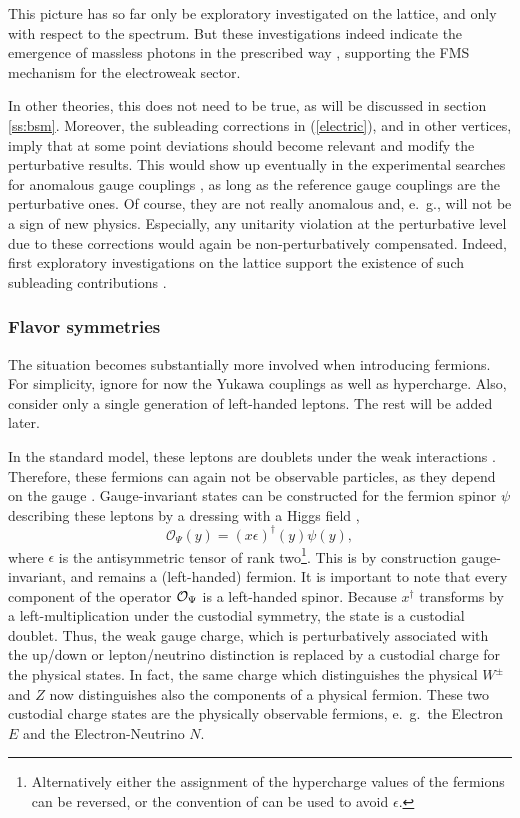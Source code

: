 \documentclass[final,12pt]{article}
\newcommand*{\no}{\noindent}
\newcommand*{\be}{\begin{equation}}
\newcommand*{\ee}{\end{equation}}
\newcommand*{\pref}[1]{(\ref{#1})}
\newcommand*{\1}{1\!\!\!\bot}
\newcommand*{\op}{{\cal O}}
\begin{document}
This picture has so far only be exploratory investigated on the lattice, and only with respect to the spectrum. But these investigations indeed indicate the emergence of massless photons in the prescribed way \cite{Shrock:1985ur,Shrock:1985un,Lee:1985yi}, supporting the FMS mechanism for the electroweak sector.

In other theories, this does not need to be true, as will be discussed in section \ref{ss:bsm}. Moreover, the subleading corrections in \pref{electric}, and in other vertices, imply that at some point deviations should become relevant and modify the perturbative results. This would show up eventually in the experimental searches for anomalous gauge couplings \cite{Gounaris:1996rz,Baak:2013fwa}, as long as the reference gauge couplings are the perturbative ones. Of course, they are not really anomalous and, e.\ g., will not be a sign of new physics. Especially, any unitarity violation at the perturbative level due to these corrections \cite{Bohm:2001yx} would again be non-perturbatively compensated. Indeed, first exploratory investigations on the lattice support the existence of such subleading contributions \cite{Raubitzek:unpublished}.

\subsubsection{Flavor symmetries}\label{ss:flavor}

The situation becomes substantially more involved when introducing fermions. For simplicity, ignore for now the Yukawa couplings as well as hypercharge. Also, consider only a single generation of left-handed leptons. The rest will be added later.

In the standard model, these leptons are doublets under the weak interactions \cite{Bohm:2001yx}. Therefore, these fermions can again not be observable particles, as they depend on the gauge \cite{Frohlich:1980gj,Frohlich:1981yi}. Gauge-invariant states can be constructed for the fermion spinor $\psi$ describing these leptons by a dressing with a Higgs field \cite{Frohlich:1980gj,Frohlich:1981yi,Egger:2017tkd},
\be
\mathcal{O}_\Psi(y)= (x\epsilon)^{\dagger}(y)\psi(y)\label{opferm},
\ee
\no where $\epsilon$ is the antisymmetric tensor of rank two\footnote{Alternatively either the assignment of the hypercharge values of the fermions can be reversed, or the convention of \cite{Egger:2017tkd} can be used to avoid $\epsilon$.}. This is by construction gauge-invariant, and remains a (left-handed) fermion. It is important to note that every component of the operator $\op_\Psi$ is a left-handed spinor. Because $x^\dagger$ transforms by a left-multiplication under the custodial symmetry, the state is a custodial doublet. Thus, the weak gauge charge, which is perturbatively associated with the up/down or lepton/neutrino distinction \cite{Bohm:2001yx} is replaced by a custodial charge for the physical states. In fact, the same charge which distinguishes the physical $W^\pm$ and $Z$ now distinguishes also the components of a physical fermion. These two custodial charge states are the physically observable fermions, e.\ g.\ the Electron $E$ and the Electron-Neutrino $N$.
\end{document}
